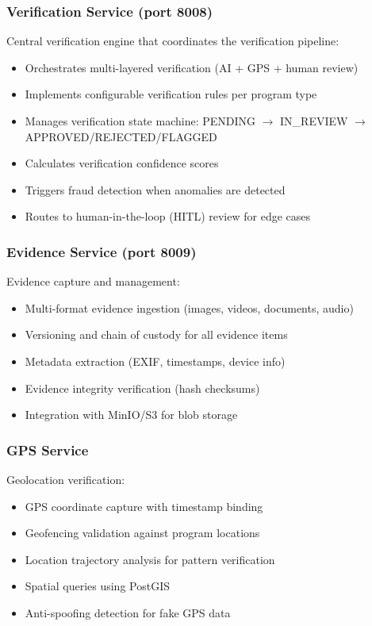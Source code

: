 \documentclass[11pt,a4paper]{article}
\begin{document}
\subsubsection{Verification Service (port 8008)}

Central verification engine that coordinates the verification pipeline:
\begin{itemize}
  \item Orchestrates multi-layered verification (AI + GPS + human review)
  \item Implements configurable verification rules per program type
  \item Manages verification state machine: PENDING $\rightarrow$ IN\_REVIEW $\rightarrow$ APPROVED/REJECTED/FLAGGED
  \item Calculates verification confidence scores
  \item Triggers fraud detection when anomalies are detected
  \item Routes to human-in-the-loop (HITL) review for edge cases
\end{itemize}

\subsubsection{Evidence Service (port 8009)}

Evidence capture and management:
\begin{itemize}
  \item Multi-format evidence ingestion (images, videos, documents, audio)
  \item Versioning and chain of custody for all evidence items
  \item Metadata extraction (EXIF, timestamps, device info)
  \item Evidence integrity verification (hash checksums)
  \item Integration with MinIO/S3 for blob storage
\end{itemize}

\subsubsection{GPS Service}

Geolocation verification:
\begin{itemize}
  \item GPS coordinate capture with timestamp binding
  \item Geofencing validation against program locations
  \item Location trajectory analysis for pattern verification
  \item Spatial queries using PostGIS
  \item Anti-spoofing detection for fake GPS data
\end{itemize}
\end{document}
